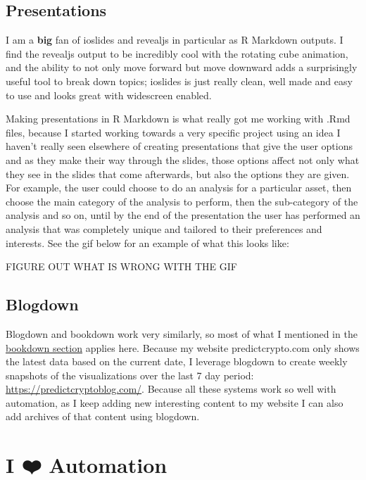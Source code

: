 \documentclass[
]{book}
\begin{document}
\hypertarget{presentations}{%
\subsection{Presentations}\label{presentations}}

I am a \textbf{big} fan of ioslides and revealjs in particular as R Markdown outputs. I find the revealjs output to be incredibly cool with the rotating cube animation, and the ability to not only move forward but move downward adds a surprisingly useful tool to break down topics; ioslides is just really clean, well made and easy to use and looks great with widescreen enabled.

Making presentations in R Markdown is what really got me working with .Rmd files, because I started working towards a very specific project using an idea I haven't really seen elsewhere of creating presentations that give the user options and as they make their way through the slides, those options affect not only what they see in the slides that come afterwards, but also the options they are given. For example, the user could choose to do an analysis for a particular asset, then choose the main category of the analysis to perform, then the sub-category of the analysis and so on, until by the end of the presentation the user has performed an analysis that was completely unique and tailored to their preferences and interests. See the gif below for an example of what this looks like:

FIGURE OUT WHAT IS WRONG WITH THE GIF

\hypertarget{blogdown}{%
\subsection{Blogdown}\label{blogdown}}

Blogdown\citep{R-blogdown} and bookdown work very similarly, so most of what I mentioned in the \protect\hyperlink{bookdown}{bookdown section} applies here. Because my website predictcrypto.com only shows the latest data based on the current date, I leverage blogdown to create weekly snapshots of the visualizations over the last 7 day period: \url{https://predictcryptoblog.com/}. Because all these systems work so well with automation, as I keep adding new interesting content to my website I can also add archives of that content using blogdown.

\hypertarget{automation}{%
\section{I ❤️ Automation}\label{automation}}
\end{document}
